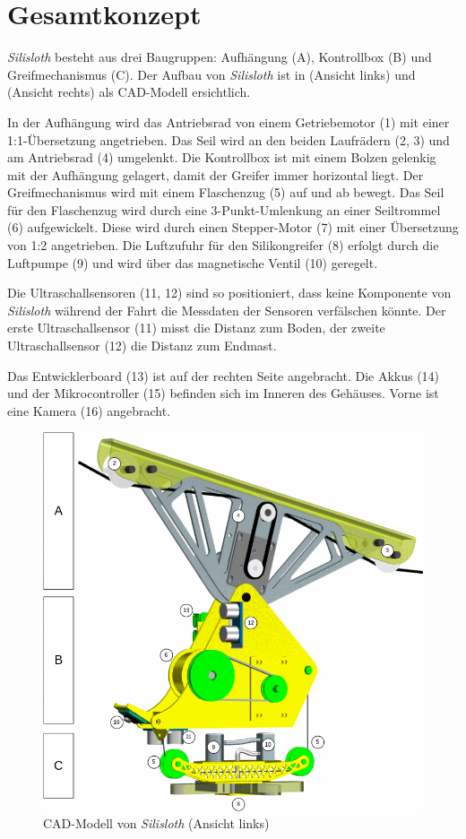 \section{Gesamtkonzept}
\label{sec:gesamtkonzept}

\textit{Silisloth} besteht aus drei Baugruppen: Aufhängung (A), Kontrollbox (B) und Greifmechanismus (C). Der Aufbau von \textit{Silisloth} ist in  (Ansicht links) und  (Ansicht rechts) als CAD-Modell ersichtlich.

In der Aufhängung wird das Antriebsrad von einem Getriebemotor (1) mit einer 1:1-Übersetzung angetrieben. Das Seil wird an den beiden Laufrädern (2, 3) und am Antriebsrad (4) umgelenkt. Die Kontrollbox ist mit einem Bolzen gelenkig mit der Aufhängung gelagert, damit der Greifer immer horizontal liegt. Der Greifmechanismus wird mit einem Flaschenzug (5) auf und ab bewegt. Das Seil für den Flaschenzug wird durch eine 3-Punkt-Umlenkung an einer Seiltrommel (6) aufgewickelt. Diese wird durch einen Stepper-Motor (7) mit einer Übersetzung von 1:2 angetrieben. Die Luftzufuhr für den Silikongreifer (8) erfolgt durch die Luftpumpe (9) und wird über das magnetische Ventil (10) geregelt.

Die Ultraschallsensoren (11, 12) sind so positioniert, dass keine Komponente von \textit{Silisloth} während der Fahrt die Messdaten der Sensoren verfälschen könnte. Der erste Ultraschallsensor (11) misst die Distanz zum Boden, der zweite Ultraschallsensor (12) die Distanz zum Endmast.

Das Entwicklerboard (13) ist auf der rechten Seite angebracht. Die Akkus (14) und der Mikrocontroller (15) befinden sich im Inneren des Gehäuses. Vorne ist eine Kamera (16) angebracht.

\begin{figure}
    \centering
    \includegraphics[width=\linewidth]{pics/cad-links.png}
    \caption{CAD-Modell von \textit{Silisloth} (Ansicht links)}
    \label{fig:laufkatze-links}
\end{figure}

